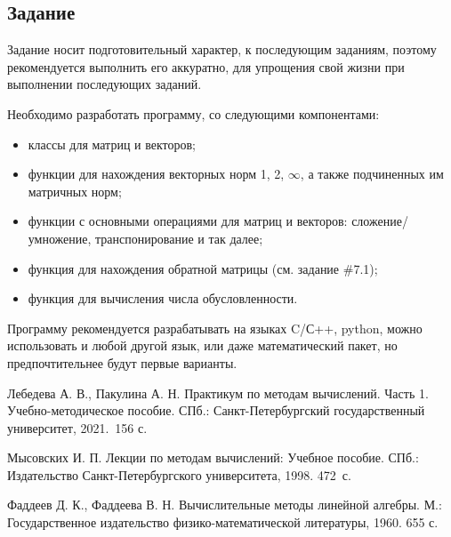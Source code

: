 \documentclass[12pt]{article}
\begin{document}
	\subsection*{Задание}
	
	Задание носит подготовительный характер, к последующим заданиям, поэтому рекомендуется выполнить его аккуратно, для упрощения свой жизни при выполнении последующих заданий.
	
	Необходимо разработать программу, со следующими компонентами:
	\begin{itemize}
		\item классы для матриц и векторов;
		\item функции для нахождения векторных норм 1, 2, $\infty$, а также подчиненных им матричных норм;
		\item функции с основными операциями для матриц и векторов: сложение/умножение, транспонирование и так далее;
		\item функция для нахождения обратной матрицы (см. задание \#7.1);
		\item функция для вычисления числа обусловленности.
	\end{itemize}
	
	Программу рекомендуется разрабатывать на языках C/С++, python, можно использовать и любой другой язык, или даже математический пакет, но предпочтительнее будут первые варианты.
	
	\renewcommand{\bibname}{{Список литературы}}
	
	\begin{thebibliography}{3}
		Лебедева А. В., Пакулина А. Н. Практикум по методам вычислений. Часть 1. Учебно-методическое пособие. СПб.: Санкт-Петербургский государственный университет, 2021.~156 с.
		
		Мысовских И. П. Лекции по методам вычислений: Учебное пособие. СПб.: Издательство Санкт-Петербургского университета, 1998. 472~с.
		
		Фаддеев Д. К., Фаддеева В. Н. Вычислительные методы линейной алгебры. М.:  Государственное издательство физико-математической литературы, 1960. 655 с.
	\end{thebibliography}
\end{document}
